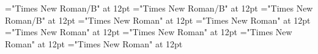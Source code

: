 \documentclass[c5paper,twoside]{article}
\begin{document}
 
\pagestyle{plain} 
\font\spanzxxSectionHeadscrSectioncolumnsscrBookscrBody="Times New Roman/B" at 12pt
\font\SectionHeadscrSectioncolumnsscrBookscrBody="Times New Roman/B" at 12pt
\font\ChapterNumberzxxParagraphscrSectioncolumnsscrBookscrBody="Times New Roman/B" at 12pt
\font\ParagraphscrSectioncolumnsscrBookscrBody="Times New Roman" at 12pt
\font\scrSectioncolumnsscrBookscrBody="Times New Roman" at 12pt
\font\columnsscrBookscrBody="Times New Roman" at 12pt
\font\scrBookscrBody="Times New Roman" at 12pt
\font\imgpicturedivpictureLeft="Times New Roman" at 12pt
\font\picturepictureRight="Times New Roman" at 12pt

\pagestyle{fancy} 
\setlength{\columnsep}{12pt} 
\setlength\columnseprule{0.4pt} 
\begin{multicols}{2}{\raggedright} 
\leftmargin 0pt{\ChapterNumberzxxParagraphscrSectioncolumnsscrBookscrBody{\lettrine{2}}
 {\raggedright} \begin{adjustwidth}{0pt}{0pt}{0pt}{0pt}\begin{center}
\spanzxxSectionHeadscrSectioncolumnsscrBookscrBody{Betlehemfɔ Abí Mɔ }\end{center}\end{adjustwidth} 
 \end{multicols}
\end{document}
